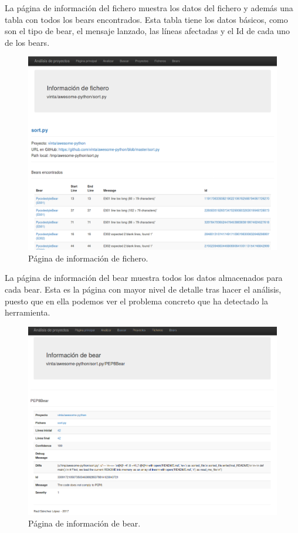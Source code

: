 \documentclass[a4paper, 12pt]{book}
\begin{document}
La página de información del fichero muestra los datos del fichero y además una tabla con todos los bears encontrados. Esta tabla tiene los datos básicos, como son el tipo de bear, el mensaje lanzado, las líneas afectadas y el Id de cada uno de los bears.
\begin{figure}[h]
  \centering
  \includegraphics[width=12cm, keepaspectratio]{img/infoFichero}
  \caption{Página de información de fichero.}
  \label{fig:infoFichero}
\end{figure}

La página de información del bear muestra todos los datos almacenados para cada bear. Esta es la página con mayor nivel de detalle tras hacer el análisis, puesto que en ella podemos ver el problema concreto que ha detectado la herramienta.
\begin{figure}[h]
  \centering
  \includegraphics[width=12cm, keepaspectratio]{img/infoBear}
  \caption{Página de información de bear.}
  \label{fig:infoBear}
\end{figure}
\end{document}

